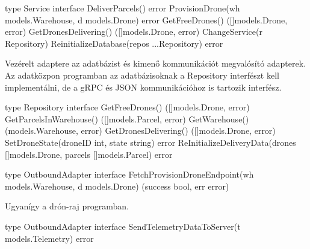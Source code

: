 \begin{python}
    type Service interface {
        DeliverParcels() error
        ProvisionDrone(wh models.Warehouse, d models.Drone) error
        GetFreeDrones() ([]models.Drone, error)
        GetDronesDelivering() ([]models.Drone, error)
        ChangeService(r Repository)
        ReinitializeDatabase(repos ...Repository) error
    }
\end{python}
Vezérelt adaptere az adatbázist és kimenő kommunikációt megvalósító adapterek.
Az adatközpon programban az adatbázisoknak a Repository interfészt kell implementálni, de a gRPC és JSON kommunikációhoz is tartozik interfész.
\begin{python}
    type Repository interface {
        GetFreeDrones() ([]models.Drone, error)
        GetParcelsInWarehouse() ([]models.Parcel, error)
        GetWarehouse() (models.Warehouse, error)
        GetDronesDelivering() ([]models.Drone, error)
        SetDroneState(droneID int, state string) error
        ReInitializeDeliveryData(drones []models.Drone, parcels []models.Parcel) error
    }

    type OutboundAdapter interface {
        FetchProvisionDroneEndpoint(wh models.Warehouse, d models.Drone) (success bool, err error)
    }
\end{python}

Ugyanígy a drón-raj programban.
\begin{python}
    type OutboundAdapter interface {
        SendTelemetryDataToServer(t models.Telemetry) error
    }
\end{python}
